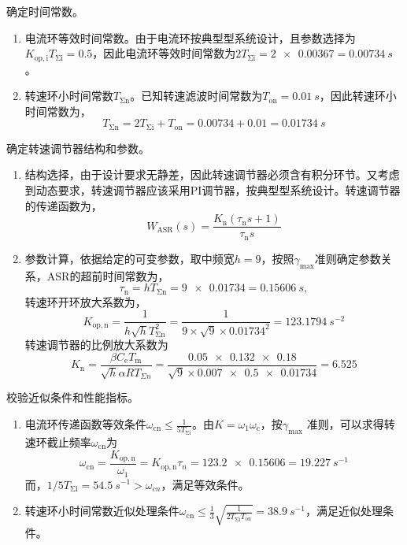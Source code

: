 \documentclass[UTF8]{ctexart}
\begin{document}
  \item 确定时间常数。
  \begin{enumerate}[label=(\alph*)]
  \item 电流环等效时间常数。由于电流环按典型型系统设计，且参数选择为$K_\mathrm{op,i}T_\mathrm{\Sigma i}=0.5$，因此电流环等效时间常数为$2T_\mathrm{\Sigma i}=\num{2x 0.00367}=\SI{0.00734}{s}$。
  \item 转速环小时间常数$T_\mathrm{\Sigma n}$。已知转速滤波时间常数为$T_\mathrm{on}=\SI{0.01}{s}$，因此转速环小时间常数为，
  \begin{equation}
  T_\mathrm{\Sigma n}=2T_\mathrm{\Sigma i} + T_\mathrm{on}=\num{0.00734}+0.01 = \SI{0.01734}{s}
  \end{equation}
  \end{enumerate}
  \item 确定转速调节器结构和参数。
  \begin{enumerate}[label=(\alph*)]
  \item 结构选择，由于设计要求无静差，因此转速调节器必须含有积分环节。又考虑到动态要求，转速调节器应该采用PI调节器，按典型型系统设计。转速调节器的传递函数为，
  \begin{equation}
  W_\mathrm{ASR}(s) = \frac{K_\mathrm{n}(\tau_\mathrm{n}s+1)}{\tau_\mathrm{n}s}
  \end{equation}
  \item 参数计算，依据给定的可变参数，取中频宽$h=9$，按照$\gamma_{\max}$准则确定参数关系，ASR的超前时间常数为，
  \begin{equation}
  \tau_\mathrm{n}=hT_\mathrm{\Sigma n}=\num{9x0.01734}=\SI{0.15606}{s},
  \end{equation}
  转速环开环放大系数为，
  \begin{equation}
  K_\mathrm{op,n} = \frac1{h\sqrt{h}T^2_\mathrm{\Sigma n}}=\frac1{9\times\sqrt{9}\times\num{0.01734}^2}=\SI{123.1794}{s^{-2}}
  \end{equation}
  转速调节器的比例放大系数为
  \begin{equation}
  K_\mathrm{n}=\frac{\beta C_\mathrm{e}T_\mathrm{m}}{\sqrt{h}\alpha RT_{\Sigma n}}=\frac{\num{0.05x0.132x0.18}}{\sqrt{9}\times\num{0.007 x 0.5 x 0.01734}}=6.525
  \end{equation}
  \end{enumerate}
  \item 校验近似条件和性能指标。
  \begin{enumerate}
  \item 电流环传递函数等效条件$\omega_\mathrm{cn}\le \frac1{5T_\mathrm{\Sigma i}}$。由$K=\omega_1\omega_\mathrm{c}$，按$\gamma_{\max}$ 准则，可以求得转速环截止频率$\omega_\mathrm{cn}$为
  \begin{equation}
  \omega_\mathrm{cn} = \frac{K_\mathrm{op,n}}{\omega_1} = K_\mathrm{op,n}\tau_{n} = \num{123.2x0.15606} = \SI{19.227}{s^{-1}}
  \end{equation}
  而，$1/5T_\mathrm{\Sigma i} = \SI{54.5}{s^{-1}}>\omega_{cn}$，满足等效条件。
  \item 转速环小时间常数近似处理条件$\omega_\mathrm{cn}\le \frac13\sqrt{\frac1{2T_\mathrm{\Sigma i}T_\mathrm{on}}}=\SI{38.9}{s^{-1}}$，满足近似处理条件。
  \end{enumerate}
\end{document}
